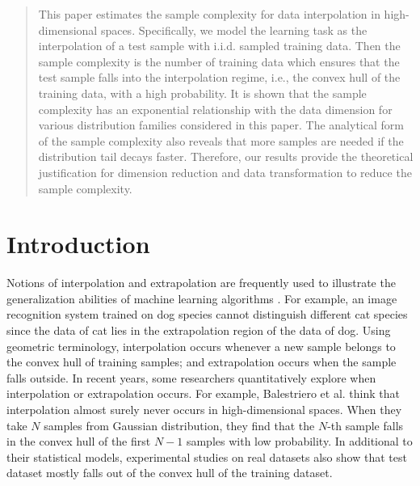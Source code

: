 \documentclass[conference,a4paper]{IEEEtran}
\begin{document}
\maketitle

\begin{abstract}
  This paper estimates the sample complexity for data interpolation in high-dimensional spaces.
  Specifically, we model the learning task as the interpolation of a test sample with i.i.d. sampled training data.
  Then the sample complexity is the number of training data which ensures that
  the test sample falls into the interpolation regime, i.e., the convex hull
  of the training data, with a high probability. It is shown that the sample complexity has an exponential relationship with the data dimension for various distribution families
  considered in this paper. The analytical form of the sample complexity also reveals that more samples are needed if the distribution tail decays faster.
  Therefore, our results provide the theoretical justification for dimension reduction and data transformation to reduce the sample complexity.
\end{abstract}


\section{Introduction}
\label{sec:intro}
Notions of interpolation and extrapolation are frequently used to illustrate the generalization
abilities of machine learning algorithms \cite{webb2020learning}. For example,
an image recognition system trained on dog species cannot distinguish different cat species since
the data of cat lies in the extrapolation region of the data of dog.
Using geometric terminology, interpolation occurs whenever a new sample belongs to the convex hull of training samples;
and extrapolation occurs when the sample falls outside.
In recent years, some researchers quantitatively explore when interpolation or extrapolation occurs.
For example, Balestriero et al. \cite{balestriero2021learning}
think that interpolation almost surely never occurs in high-dimensional spaces.
When they take $N$ samples from Gaussian distribution,
they find that the $N$-th sample falls in the convex hull of the first $N-1$ samples
with low probability.
In additional to their statistical models,
experimental studies on real datasets \cite{yousefzadeh2022extent} also show that
test dataset mostly falls out of the
convex hull of the training dataset.
\end{document}
